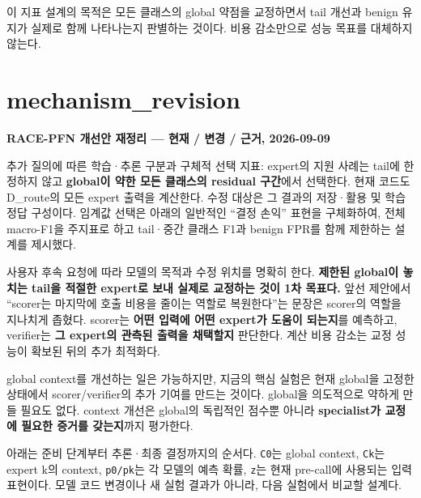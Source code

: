 이 지표 설계의 목적은 모든 클래스의 global 약점을 교정하면서 tail 개선과 benign 유지가 실제로 함께 나타나는지 판별하는 것이다. 비용 감소만으로 성능 목표를 대체하지 않는다.



\section{mechanism\_\allowbreak{}revision}
\textbf{RACE-PFN 개선안 재정리 — 현재 /\allowbreak{} 변경 /\allowbreak{} 근거, 2026-09-09}

추가 질의에 따른 학습·추론 구분과 구체적 선택 지표: expert의 지원 사례는 tail에 한정하지 않고 \textbf{global이 약한 모든 클래스의 residual 구간}에서 선택한다. 현재 코드도 D\_\allowbreak{}route의 모든 expert 출력을 계산한다. 수정 대상은 그 결과의 저장·활용 및 학습 정답 구성이다. 임계값 선택은 아래의 일반적인 “결정 손익” 표현을 구체화하여, 전체 macro-F1을 주지표로 하고 tail·중간 클래스 F1과 benign FPR를 함께 제한하는 설계를 제시했다.

사용자 후속 요청에 따라 모델의 목적과 수정 위치를 명확히 한다. \textbf{제한된 global이 놓치는 tail을 적절한 expert로 보내 실제로 교정하는 것이 1차 목표다.} 앞선 제안에서 “scorer는 마지막에 호출 비용을 줄이는 역할로 복원한다”는 문장은 scorer의 역할을 지나치게 좁혔다. scorer는 \textbf{어떤 입력에 어떤 expert가 도움이 되는지}를 예측하고, verifier는 \textbf{그 expert의 관측된 출력을 채택할지} 판단한다. 계산 비용 감소는 교정 성능이 확보된 뒤의 추가 최적화다.

global context를 개선하는 일은 가능하지만, 지금의 핵심 실험은 현재 global을 고정한 상태에서 scorer/\allowbreak{}verifier의 추가 기여를 만드는 것이다. global을 의도적으로 약하게 만들 필요도 없다. context 개선은 global의 독립적인 점수뿐 아니라 \textbf{specialist가 교정에 필요한 증거를 갖는지}까지 평가한다.

아래는 준비 단계부터 추론·최종 결정까지의 순서다. \texttt{C0}는 global context, \texttt{Ck}는 expert k의 context, \texttt{p0/\allowbreak{}\allowbreak{}pk}는 각 모델의 예측 확률, \texttt{z}는 현재 pre-call에 사용되는 입력 표현이다. 모델 코드 변경이나 새 실험 결과가 아니라, 다음 실험에서 비교할 설계다.

